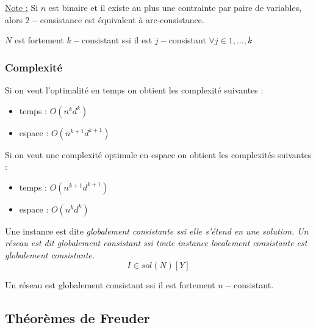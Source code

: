 
\underline{Note :} Si $n$ est binaire et il existe au plus une contrainte par paire de variables,
alors $2-$consistance est équivalent à arc-consistance.

\begin{df}
    $N$ est fortement $k-$consistant ssi il est $j-$consistant $\forall j \in 1, \dots, k$
\end{df}

\subsubsection*{Complexité}

Si on veut l'optimalité en temps on obtient les complexité suivantes :
\begin{itemize}
    \item temps : $O(n^kd^k)$
    \item espace : $O(n^{k+1}d^{k+1})$
\end{itemize}
Si on veut une complexité optimale en espace on obtient les complexités suivantes :
\begin{itemize}
    \item temps : $O(n^{k+1}d^{k+1})$
    \item espace : $O(n^kd^k)$
\end{itemize}

\begin{df}
    Une instance est dite \em{globalement consistante} ssi elle s'étend en une solution. Un réseau est
    dit \em{globalement consistant} ssi toute instance localement consistante est globalement
    consistante.
    \begin{displaymath} I \in sol(N)[Y] \end{displaymath}
\end{df}

\begin{prop}
    Un réseau est globalement consistant ssi il est fortement $n-$consistant.
\end{prop}

\subsection{Théorèmes de Freuder}

